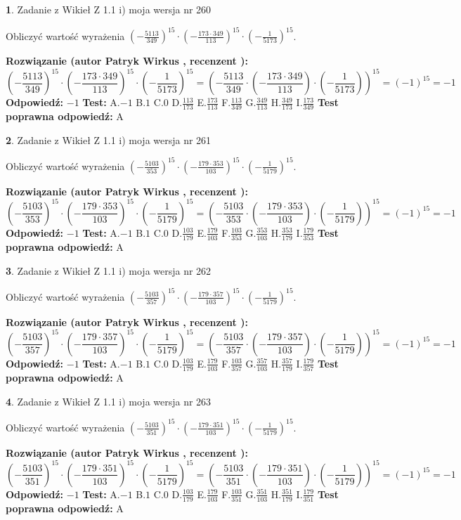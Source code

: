 \documentclass[12pt, a4paper]{article}
\theoremstyle{definition} %
\newtheorem{zad}{}
\newcommand{\zadStart}[1]{\begin{zad}#1\newline}
\newcommand{\zadStop}{\end{zad}}
\newcommand{\rozwStart}[2]{\noindent \textbf{Rozwiązanie (autor #1 , recenzent #2): }\newline}
\newcommand{\rozwStop}{\newline}
\newcommand{\odpStart}{\noindent \textbf{Odpowiedź:}\newline}
\newcommand{\odpStop}{\newline}
\newcommand{\testStart}{\noindent \textbf{Test:}\newline}
\newcommand{\testStop}{\newline}
\newcommand{\kluczStart}{\noindent \textbf{Test poprawna odpowiedź:}\newline}
\newcommand{\kluczStop}{\newline}
\begin{document}
\zadStart{Zadanie z Wikieł Z 1.1 i) moja wersja nr 260}

Obliczyć wartość wyrażenia $(-\frac{5113}{349})^{15} \cdot (-\frac{173 \cdot 349}{113})^{15} \cdot (-\frac{1}{5173})^{15}$.
\zadStop
\rozwStart{Patryk Wirkus}{}
$$(-\frac{5113}{349})^{15} \cdot (-\frac{173 \cdot 349}{113})^{15} \cdot (-\frac{1}{5173})^{15} = (-\frac{5113}{349} \cdot (-\frac{173 \cdot 349}{113}) \cdot (-\frac{1}{5173}))^{15} = (-1)^{15} = -1$$
\rozwStop
\odpStart
$-1$
\odpStop
\testStart
A.$-1$ B.$1$ C.$0$ D.$\frac{113}{173}$ E.$\frac{173}{113}$
F.$\frac{113}{349}$ G.$\frac{349}{113}$
H.$\frac{349}{173}$
I.$\frac{173}{349}$
\testStop
\kluczStart
A
\kluczStop



\zadStart{Zadanie z Wikieł Z 1.1 i) moja wersja nr 261}

Obliczyć wartość wyrażenia $(-\frac{5103}{353})^{15} \cdot (-\frac{179 \cdot 353}{103})^{15} \cdot (-\frac{1}{5179})^{15}$.
\zadStop
\rozwStart{Patryk Wirkus}{}
$$(-\frac{5103}{353})^{15} \cdot (-\frac{179 \cdot 353}{103})^{15} \cdot (-\frac{1}{5179})^{15} = (-\frac{5103}{353} \cdot (-\frac{179 \cdot 353}{103}) \cdot (-\frac{1}{5179}))^{15} = (-1)^{15} = -1$$
\rozwStop
\odpStart
$-1$
\odpStop
\testStart
A.$-1$ B.$1$ C.$0$ D.$\frac{103}{179}$ E.$\frac{179}{103}$
F.$\frac{103}{353}$ G.$\frac{353}{103}$
H.$\frac{353}{179}$
I.$\frac{179}{353}$
\testStop
\kluczStart
A
\kluczStop



\zadStart{Zadanie z Wikieł Z 1.1 i) moja wersja nr 262}

Obliczyć wartość wyrażenia $(-\frac{5103}{357})^{15} \cdot (-\frac{179 \cdot 357}{103})^{15} \cdot (-\frac{1}{5179})^{15}$.
\zadStop
\rozwStart{Patryk Wirkus}{}
$$(-\frac{5103}{357})^{15} \cdot (-\frac{179 \cdot 357}{103})^{15} \cdot (-\frac{1}{5179})^{15} = (-\frac{5103}{357} \cdot (-\frac{179 \cdot 357}{103}) \cdot (-\frac{1}{5179}))^{15} = (-1)^{15} = -1$$
\rozwStop
\odpStart
$-1$
\odpStop
\testStart
A.$-1$ B.$1$ C.$0$ D.$\frac{103}{179}$ E.$\frac{179}{103}$
F.$\frac{103}{357}$ G.$\frac{357}{103}$
H.$\frac{357}{179}$
I.$\frac{179}{357}$
\testStop
\kluczStart
A
\kluczStop



\zadStart{Zadanie z Wikieł Z 1.1 i) moja wersja nr 263}

Obliczyć wartość wyrażenia $(-\frac{5103}{351})^{15} \cdot (-\frac{179 \cdot 351}{103})^{15} \cdot (-\frac{1}{5179})^{15}$.
\zadStop
\rozwStart{Patryk Wirkus}{}
$$(-\frac{5103}{351})^{15} \cdot (-\frac{179 \cdot 351}{103})^{15} \cdot (-\frac{1}{5179})^{15} = (-\frac{5103}{351} \cdot (-\frac{179 \cdot 351}{103}) \cdot (-\frac{1}{5179}))^{15} = (-1)^{15} = -1$$
\rozwStop
\odpStart
$-1$
\odpStop
\testStart
A.$-1$ B.$1$ C.$0$ D.$\frac{103}{179}$ E.$\frac{179}{103}$
F.$\frac{103}{351}$ G.$\frac{351}{103}$
H.$\frac{351}{179}$
I.$\frac{179}{351}$
\testStop
\kluczStart
A
\kluczStop
\end{document}
